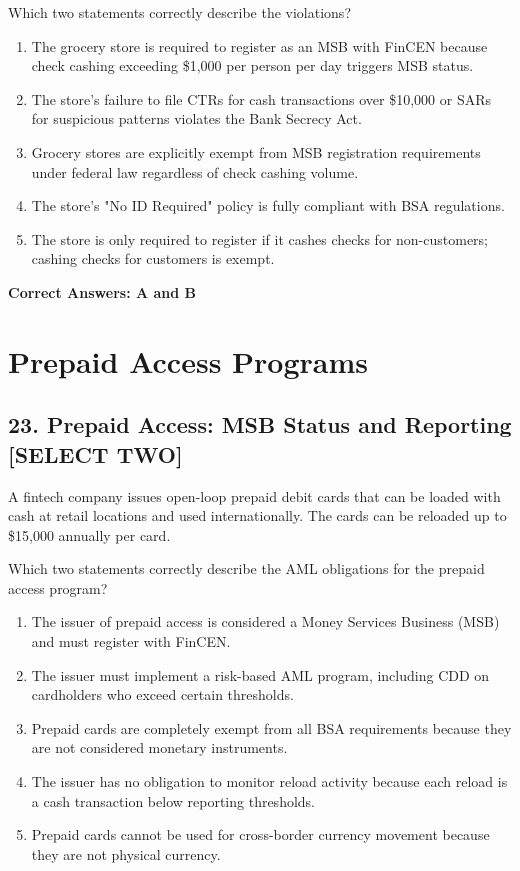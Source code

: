 \documentclass[11pt,a4paper]{article}
\begin{document}
	Which two statements correctly describe the violations?
	
	\begin{enumerate}[label=\Alph*.]
		\item The grocery store is required to register as an MSB with FinCEN because check cashing exceeding \$1,000 per person per day triggers MSB status.
		\item The store's failure to file CTRs for cash transactions over \$10,000 or SARs for suspicious patterns violates the Bank Secrecy Act.
		\item Grocery stores are explicitly exempt from MSB registration requirements under federal law regardless of check cashing volume.
		\item The store's "No ID Required" policy is fully compliant with BSA regulations.
		\item The store is only required to register if it cashes checks for non-customers; cashing checks for customers is exempt.
	\end{enumerate}
	
	\textbf{Correct Answers: A and B}
	
	\section{Prepaid Access Programs}
	
	\subsection{23. Prepaid Access: MSB Status and Reporting \textnormal{[SELECT TWO]}}
	
	A fintech company issues open-loop prepaid debit cards that can be loaded with cash at retail locations and used internationally. The cards can be reloaded up to \$15,000 annually per card.
	
	Which two statements correctly describe the AML obligations for the prepaid access program?
	
	\begin{enumerate}[label=\Alph*.]
		\item The issuer of prepaid access is considered a Money Services Business (MSB) and must register with FinCEN.
		\item The issuer must implement a risk-based AML program, including CDD on cardholders who exceed certain thresholds.
		\item Prepaid cards are completely exempt from all BSA requirements because they are not considered monetary instruments.
		\item The issuer has no obligation to monitor reload activity because each reload is a cash transaction below reporting thresholds.
		\item Prepaid cards cannot be used for cross-border currency movement because they are not physical currency.
	\end{enumerate}
	
\end{document}
